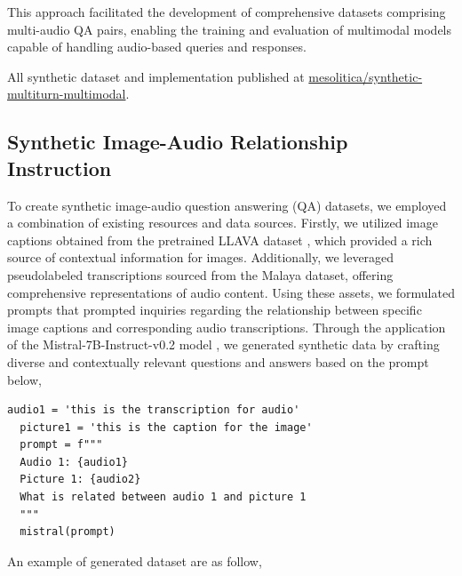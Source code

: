 \documentclass[preprint]{article}
\begin{document}
This approach facilitated the development of comprehensive datasets comprising multi-audio QA pairs, enabling the training and evaluation of multimodal models capable of handling audio-based queries and responses.

All synthetic dataset and implementation published at \href{https://huggingface.co/datasets/mesolitica/synthetic-multiturn-multimodal#multi-audio}{mesolitica/synthetic-multiturn-multimodal}.

\subsection{Synthetic Image-Audio Relationship Instruction}

To create synthetic image-audio question answering (QA) datasets, we employed a combination of existing resources and data sources. Firstly, we utilized image captions obtained from the pretrained LLAVA dataset \cite{liu2023visual}, which provided a rich source of contextual information for images. Additionally, we leveraged pseudolabeled transcriptions sourced from the Malaya dataset, offering comprehensive representations of audio content. Using these assets, we formulated prompts that prompted inquiries regarding the relationship between specific image captions and corresponding audio transcriptions. Through the application of the Mistral-7B-Instruct-v0.2 model \cite{jiang2023mistral}, we generated synthetic data by crafting diverse and contextually relevant questions and answers based on the prompt below,

\begin{lstlisting}[breaklines=true]
  audio1 = 'this is the transcription for audio'
  picture1 = 'this is the caption for the image'
  prompt = f"""
  Audio 1: {audio1} 
  Picture 1: {audio2}
  What is related between audio 1 and picture 1
  """
  mistral(prompt)
\end{lstlisting}

An example of generated dataset are as follow,
\end{document}
